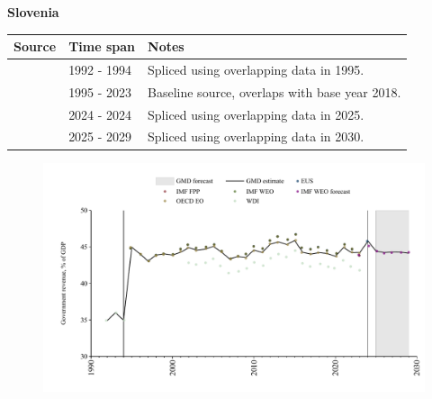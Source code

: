 \documentclass[12pt,a4paper,landscape]{article}
\begin{document}
\begin{adjustbox}{max totalsize={\paperwidth}{\paperheight},center}
\begin{minipage}[t][\textheight][t]{\textwidth}
\vspace*{0.5cm}
{}
\begin{center}
{\Large\bfseries Slovenia}
\end{center}
\vspace{0.5cm}
\begin{table}[H]
\centering
\small
\begin{tabular}{|l|l|l|}
\hline
\textbf{Source} & \textbf{Time span} & \textbf{Notes} \\
\hline
\rowcolor{white}\cite{WDI}& 1992 - 1994 &Spliced using overlapping data in 1995.\\
\rowcolor{lightgray}\cite{OECD_EO}& 1995 - 2023 &Baseline source, overlaps with base year 2018.\\
\rowcolor{white}\cite{EUS}& 2024 - 2024 &Spliced using overlapping data in 2025.\\
\rowcolor{lightgray}\cite{IMF_WEO_forecast}& 2025 - 2029 &Spliced using overlapping data in 2030.\\
\hline
\end{tabular}
\end{table}
\begin{figure}[H]
\centering
\includegraphics[width=\textwidth,height=0.6\textheight,keepaspectratio]{graphs/SVN_govrev_GDP.pdf}
\end{figure}
\end{minipage}
\end{adjustbox}
\end{document}
